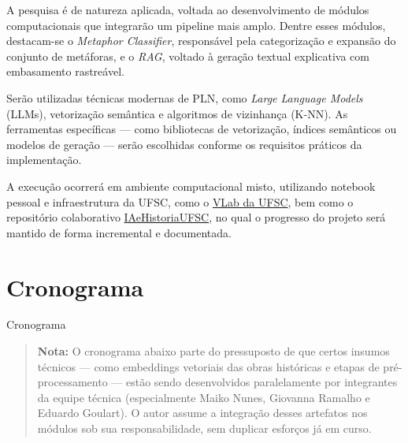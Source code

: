 A pesquisa é de natureza aplicada, voltada ao desenvolvimento de módulos
computacionais que integrarão um pipeline mais amplo. Dentre esses
módulos, destacam-se o \emph{Metaphor Classifier}, responsável pela
categorização e expansão do conjunto de metáforas, e o \emph{RAG},
voltado à geração textual explicativa com embasamento rastreável.

Serão utilizadas técnicas modernas de PLN, como \emph{Large Language
Models} (LLMs), vetorização semântica e algoritmos de vizinhança (K-NN).
As ferramentas específicas --- como bibliotecas de vetorização, índices
semânticos ou modelos de geração --- serão escolhidas conforme os
requisitos práticos da implementação.

A execução ocorrerá em ambiente computacional misto, utilizando notebook
pessoal e infraestrutura da UFSC, como o
\href{https://jupyter.vlab.ufsc.br/hub}{VLab da UFSC}, bem como o
repositório colaborativo
\href{https://github.com/iaehistoriaUFSC/metaphoriq}{IAeHistoriaUFSC},
no qual o progresso do projeto será mantido de forma incremental e
documentada.

\section{\textbf{Cronograma}}{Cronograma}\label{cronograma}

\begin{quote}
\textbf{Nota:} O cronograma abaixo parte do pressuposto de que certos
insumos técnicos --- como embeddings vetoriais das obras históricas e
etapas de pré-processamento --- estão sendo desenvolvidos paralelamente
por integrantes da equipe técnica (especialmente Maiko Nunes, Giovanna
Ramalho e Eduardo Goulart). O autor assume a integração desses artefatos
nos módulos sob sua responsabilidade, sem duplicar esforços já em curso.
\end{quote}

